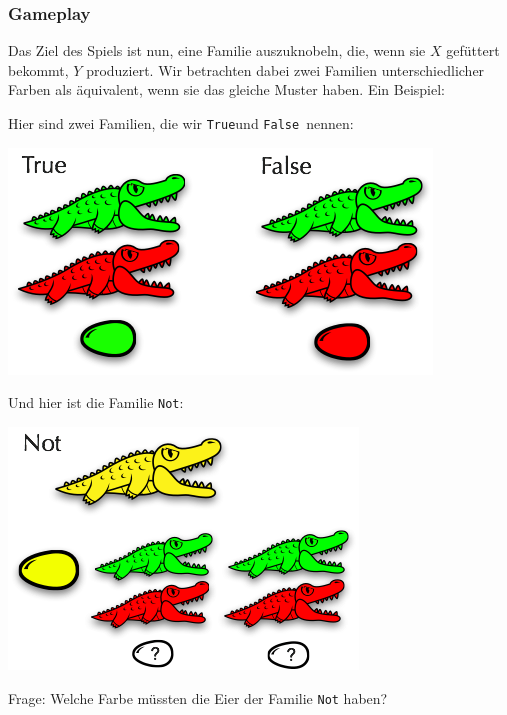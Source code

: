 \documentclass{beamer}
\begin{document}
\begin{frame}
\frametitle{Gameplay}

Das Ziel des Spiels ist nun, eine Familie auszuknobeln, die, wenn sie $X$ gefüttert bekommt, $Y$ produziert. Wir betrachten dabei zwei Familien unterschiedlicher Farben als \glqq äquivalent\grqq , wenn sie das gleiche Muster haben. Ein Beispiel:\pause

\begin{multicols}{2}

Hier sind zwei Familien, die wir \glqq \texttt{True}\grqq und \glqq \texttt{False}\grqq\ nennen:

\begin{center}
\includegraphics[scale=0.25]{gameplay_1.png} 
\end{center}

\columnbreak
\pause

Und hier ist die Familie \glqq \texttt{Not}\grqq :

\begin{center}
\includegraphics[scale=0.3]{gameplay_2.png} 
\end{center}

\end{multicols}

Frage: Welche Farbe müssten die Eier der Familie \texttt{Not} haben?

\end{frame}
\end{document}
